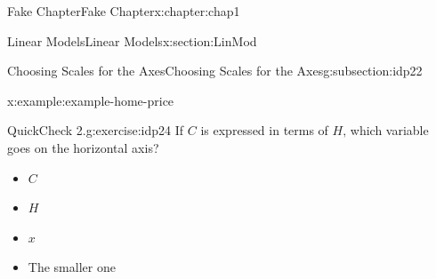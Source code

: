 \documentclass[oneside,10pt,]{book}
\numberwithin{equation}{section}
\begin{document}
\begin{chapterptx}{Fake Chapter}{}{Fake Chapter}{}{}{x:chapter:chap1}
\begin{sectionptx}{Linear Models}{}{Linear Models}{}{}{x:section:LinMod}
\begin{subsectionptx}{Choosing Scales for the Axes}{}{Choosing Scales for the Axes}{}{}{g:subsection:idp22}
\begin{example}{}{x:example:example-home-price}
\begin{enumerate}[label=\alph*]
\end{enumerate}
%
\end{example}
\begin{inlineexercise}{QuickCheck 2.}{g:exercise:idp24}%
If \(C\) is expressed in terms of \(H\text{,}\) which variable goes on the horizontal axis?%
\par
\begin{itemize}[label=$\odot$,leftmargin=3em,]
\item{}\(\displaystyle C\)%

\item{}\(\displaystyle H\)%

\item{}\(\displaystyle x\)%

\item{}The smaller one%


\end{itemize}
\end{inlineexercise}
\end{subsectionptx}
\end{sectionptx}
\end{chapterptx}
\end{document}
